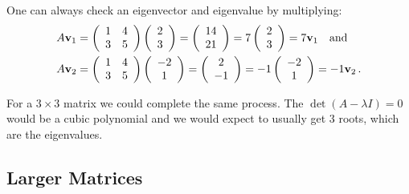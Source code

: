 One can always check an eigenvector and eigenvalue by multiplying:
\begin{align*}
A \mathbf{v}_1 &= \left(\begin{array}{cc} 1 & 4 \\
                             3 & 5
                    \end{array} \right)
          \left(\begin{array}{c} 2 \\
                                 3
                    \end{array} \right)
         = \left(\begin{array}{c} 14 \\
                                   21
                    \end{array} \right)
         = 7 \left(\begin{array}{c} 2 \\
                                     3
                    \end{array} \right)
	=7 \mathbf{v}_1
\quad\text{and}\\
A \mathbf{v}_2 &= \left(\begin{array}{cc} 1 & 4 \\
                             3 & 5
                    \end{array} \right)
          \left(\begin{array}{c} -2 \\
                                 1
                    \end{array} \right)
         = \left(\begin{array}{c} 2 \\
                                   -1
                    \end{array} \right)
         = -1 \left(\begin{array}{c} -2 \\
                                      1
                    \end{array} \right)
	= -1 \mathbf{v}_2
\,.
\end{align*}

For a $3 \times 3$ matrix we could complete the same process.
The $\det(A -\lambda I)=0$ would be a cubic polynomial and we
would expect to usually get 3 roots, which are the eigenvalues.



\subsection*{Larger Matrices}

